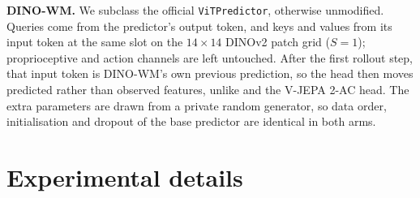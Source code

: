 \textbf{DINO-WM.} We subclass the official \texttt{ViTPredictor}, otherwise unmodified.
%
Queries come from the predictor's output token, and keys and values from its input token at the same slot on the
$14{\times}14$ DINOv2 patch grid ($S{=}1$); proprioceptive and action channels are left untouched.
%
After the first rollout step, that input token is DINO-WM's own previous prediction, so the head then moves predicted
rather than observed features, unlike \ours{} and the V-JEPA 2-AC head.
%
The extra parameters are drawn from a private random generator, so data order, initialisation and dropout of the base
predictor are identical in both arms.



\section{Experimental details}\label{app:exp}
